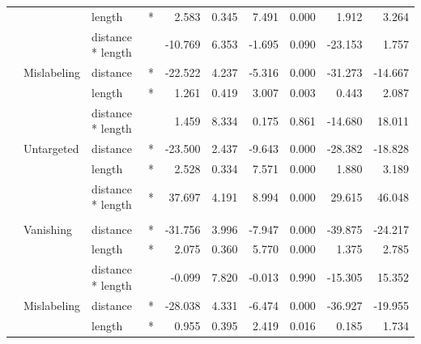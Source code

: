 \begin{longtable}[t]{llllrrrrrr}
\cmidrule{3-10}\nopagebreak
\hspace{1em} &  & length & * & 2.583 & 0.345 & 7.491 & 0.000 & 1.912 & 3.264\\
\cmidrule{3-10}\nopagebreak
\hspace{1em} &  & distance * length &  & -10.769 & 6.353 & -1.695 & 0.090 & -23.153 & 1.757\\
\cmidrule{2-10}\nopagebreak
\hspace{1em} & Mislabeling & distance & * & -22.522 & 4.237 & -5.316 & 0.000 & -31.273 & -14.667\\
\cmidrule{3-10}\nopagebreak
\hspace{1em} &  & length & * & 1.261 & 0.419 & 3.007 & 0.003 & 0.443 & 2.087\\
\cmidrule{3-10}\nopagebreak
\hspace{1em} &  & distance * length &  & 1.459 & 8.334 & 0.175 & 0.861 & -14.680 & 18.011\\
\cmidrule{2-10}\nopagebreak
\hspace{1em} & Untargeted & distance & * & -23.500 & 2.437 & -9.643 & 0.000 & -28.382 & -18.828\\
\cmidrule{3-10}\nopagebreak
\hspace{1em} &  & length & * & 2.528 & 0.334 & 7.571 & 0.000 & 1.880 & 3.189\\
\cmidrule{3-10}\nopagebreak
\hspace{1em} &  & distance * length & * & 37.697 & 4.191 & 8.994 & 0.000 & 29.615 & 46.048\\
\cmidrule{1-10}\pagebreak[0]
\addlinespace[0.3em]
\multicolumn{10}{l}{\textbf{Faster R-CNN}}\\
\hspace{1em} & Vanishing & distance & * & -31.756 & 3.996 & -7.947 & 0.000 & -39.875 & -24.217\\
\cmidrule{3-10}\nopagebreak
\hspace{1em} &  & length & * & 2.075 & 0.360 & 5.770 & 0.000 & 1.375 & 2.785\\
\cmidrule{3-10}\nopagebreak
\hspace{1em} &  & distance * length &  & -0.099 & 7.820 & -0.013 & 0.990 & -15.305 & 15.352\\
\cmidrule{2-10}\nopagebreak
\hspace{1em} & Mislabeling & distance & * & -28.038 & 4.331 & -6.474 & 0.000 & -36.927 & -19.955\\
\cmidrule{3-10}\nopagebreak
\hspace{1em} &  & length & * & 0.955 & 0.395 & 2.419 & 0.016 & 0.185 & 1.734\\

\end{longtable}
